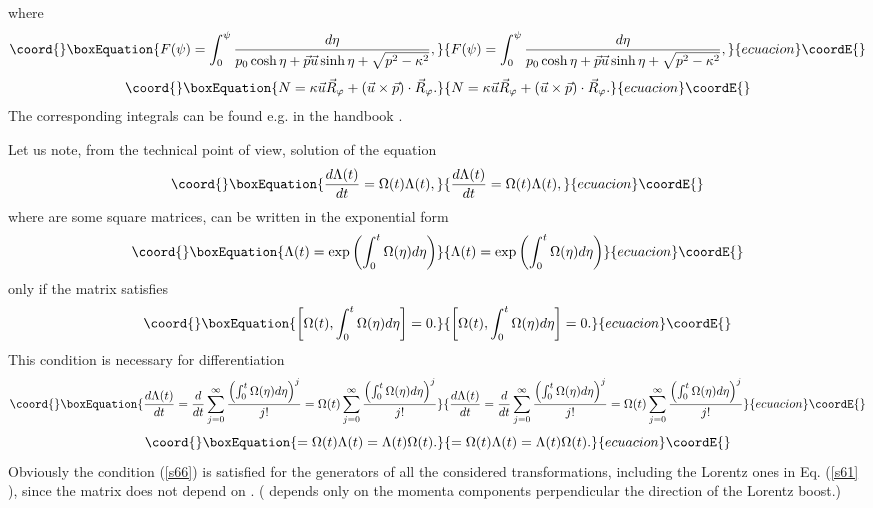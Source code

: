 \documentclass[a4paper,a4paper]{article}
\begin{document}
where 
\begin{equation}\coord{}\boxEquation{
F(\psi )=\int_{0}^{\psi }\frac{d\eta }{p_{0}\cosh \eta +\vec{p}\vec{u}\sinh
\eta +\sqrt{p^{2}-\kappa ^{2}}},  \label{s62}
}{
F(\psi )=\int_{0}^{\psi }\frac{d\eta }{p_{0}\cosh \eta +\vec{p}\vec{u}\sinh
\eta +\sqrt{p^{2}-\kappa ^{2}}},  }{ecuacion}\coordE{}\end{equation}%
\begin{equation}\coord{}\boxEquation{
N=\kappa \vec{u}\vec{R}_{\varphi }+\left( \vec{u}\times \vec{p}\right) \cdot 
\vec{R}_{\varphi }.  \label{sa62}
}{
N=\kappa \vec{u}\vec{R}_{\varphi }+\left( \vec{u}\times \vec{p}\right) \cdot 
\vec{R}_{\varphi }.  }{ecuacion}\coordE{}\end{equation}%
The corresponding integrals can be found e.g. in the handbook \cite{pru}.

Let us note, from the technical point of view, solution of the equation 
\begin{equation}\coord{}\boxEquation{
\frac{d\Lambda (t)}{dt}=\Omega (t)\Lambda (t),  \label{s63}
}{
\frac{d\Lambda (t)}{dt}=\Omega (t)\Lambda (t),  }{ecuacion}\coordE{}\end{equation}%
where \myHighlight{$\Lambda ,\Omega $}\coordHE{} are some square matrices, can be written in the
exponential form 
\begin{equation}\coord{}\boxEquation{
\Lambda (t)=\exp \left( \int_{0}^{t}\Omega (\eta )d\eta \right)  \label{s64}
}{
\Lambda (t)=\exp \left( \int_{0}^{t}\Omega (\eta )d\eta \right)  }{ecuacion}\coordE{}\end{equation}%
only if the matrix \myHighlight{$\Omega $}\coordHE{} satisfies 
\begin{equation}\coord{}\boxEquation{
\left[ \Omega (t),\int_{0}^{t}\Omega (\eta )d\eta \right] =0.  \label{s65}
}{
\left[ \Omega (t),\int_{0}^{t}\Omega (\eta )d\eta \right] =0.  }{ecuacion}\coordE{}\end{equation}%
This condition is necessary for differentiation 
\begin{equation}\coord{}\boxEquation{
\frac{d\Lambda (t)}{dt}=\frac{d}{dt}\sum_{j=0}^{\infty }\frac{\left(
\int_{0}^{t}\Omega (\eta )d\eta \right) ^{j}}{j!}=\Omega
(t)\sum_{j=0}^{\infty }\frac{\left( \int_{0}^{t}\Omega (\eta )d\eta \right)
^{j}}{j!}  \label{s66}
}{
\frac{d\Lambda (t)}{dt}=\frac{d}{dt}\sum_{j=0}^{\infty }\frac{\left(
\int_{0}^{t}\Omega (\eta )d\eta \right) ^{j}}{j!}=\Omega
(t)\sum_{j=0}^{\infty }\frac{\left( \int_{0}^{t}\Omega (\eta )d\eta \right)
^{j}}{j!}  }{ecuacion}\coordE{}\end{equation}%
\begin{equation*}\coord{}\boxEquation{
=\Omega (t)\Lambda (t)=\Lambda (t)\Omega (t).
}{
=\Omega (t)\Lambda (t)=\Lambda (t)\Omega (t).
}{ecuacion}\coordE{}\end{equation*}%
Obviously the condition (\ref{s66}) is satisfied for the generators of all
the considered transformations, including the Lorentz ones in Eq. (\ref{s61}%
), since the matrix \coordHE{} does not depend on \myHighlight{$\psi $}\coordHE{}. (\coordHE{} depends only on the
momenta components perpendicular the direction of the Lorentz boost.)
\end{document}
